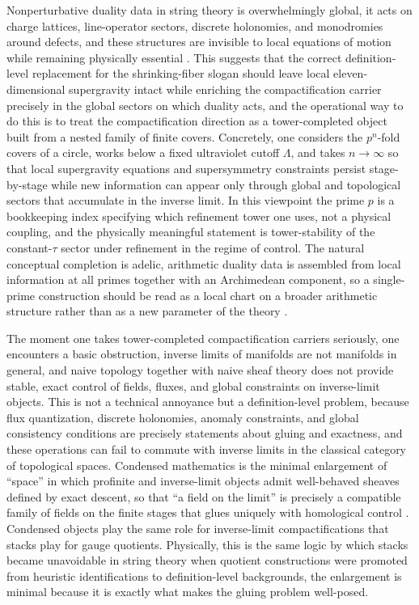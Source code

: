 \documentclass[11pt]{article}
\theoremstyle{remark}
\begin{document}
Nonperturbative duality data in string theory is overwhelmingly global, it acts on charge lattices, line-operator sectors, discrete holonomies, and monodromies around defects, and these structures are invisible to local equations of motion while remaining physically essential \cite{Schwarz1995, Sen1994}. This suggests that the correct definition-level replacement for the shrinking-fiber slogan should leave local eleven-dimensional supergravity intact while enriching the compactification carrier precisely in the global sectors on which duality acts, and the operational way to do this is to treat the compactification direction as a tower-completed object built from a nested family of finite covers. Concretely, one considers the \(p^{n}\)-fold covers of a circle, works below a fixed ultraviolet cutoff \(\Lambda\), and takes \(n\to\infty\) so that local supergravity equations and supersymmetry constraints persist stage-by-stage while new information can appear only through global and topological sectors that accumulate in the inverse limit. In this viewpoint the prime \(p\) is a bookkeeping index specifying which refinement tower one uses, not a physical coupling, and the physically meaningful statement is tower-stability of the constant-\(\tau\) sector under refinement in the regime of control. The natural conceptual completion is adelic, arithmetic duality data is assembled from local information at all primes together with an Archimedean component, so a single-prime construction should be read as a local chart on a broader arithmetic structure rather than as a new parameter of the theory \cite{Frenkel2007, GaitsgoryLurie2019}.

The moment one takes tower-completed compactification carriers seriously, one encounters a basic obstruction, inverse limits of manifolds are not manifolds in general, and naive topology together with naive sheaf theory does not provide stable, exact control of fields, fluxes, and global constraints on inverse-limit objects. This is not a technical annoyance but a definition-level problem, because flux quantization, discrete holonomies, anomaly constraints, and global consistency conditions are precisely statements about gluing and exactness, and these operations can fail to commute with inverse limits in the classical category of topological spaces. Condensed mathematics is the minimal enlargement of ``space'' in which profinite and inverse-limit objects admit well-behaved sheaves defined by exact descent, so that ``a field on the limit'' is precisely a compatible family of fields on the finite stages that glues uniquely with homological control \cite{ClausenScholze}. Condensed objects play the same role for inverse-limit compactifications that stacks play for gauge quotients. Physically, this is the same logic by which stacks became unavoidable in string theory when quotient constructions were promoted from heuristic identifications to definition-level backgrounds, the enlargement is minimal because it is exactly what makes the gluing problem well-posed.
\end{document}
